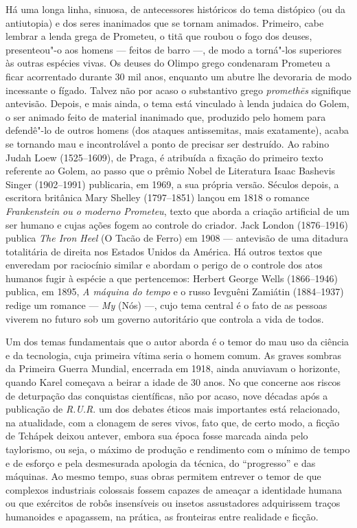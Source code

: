 Há uma longa linha, sinuosa, de antecessores históricos do tema distópico
(ou da antiutopia) e dos seres inanimados que se tornam animados. Primeiro,
cabe lembrar a lenda grega de Prometeu, o titã que roubou o fogo dos deuses,
presenteou"-o aos homens --- feitos de barro ---,  de modo a torná"-los superiores às
outras espécies vivas. Os deuses do Olimpo grego condenaram Prometeu a ficar
acorrentado durante 30 mil anos, enquanto um abutre lhe devoraria de modo
incessante o fígado. Talvez não por acaso o substantivo grego \textit{prometh\=es}
signifique antevisão. Depois, e mais ainda, o tema está
vinculado à lenda judaica do Golem, o ser animado feito de material inanimado
que, produzido pelo homem para defendê"-lo de outros homens (dos ataques
antissemitas, mais exatamente), acaba se tornando mau e incontrolável a ponto
de precisar ser destruído. Ao rabino Judah Loew (1525--1609), de Praga, é
atribuída a fixação do primeiro texto referente ao Golem, ao passo que o prêmio
Nobel de Literatura Isaac Bashevis Singer (1902--1991) publicaria, em 1969, a
sua própria versão. Séculos depois, a escritora britânica Mary Shelley
(1797--1851) lançou em 1818 o romance \textit{Frankenstein ou o moderno Prometeu}, texto
que aborda a criação artificial de um ser humano e cujas ações fogem ao
controle do criador. Jack London (1876--1916) publica \textit{The Iron Heel} (O Tacão de
Ferro) em 1908 --- antevisão de uma ditadura totalitária de direita nos Estados
Unidos da América. Há outros textos que enveredam por raciocínio similar e
abordam o perigo de o controle dos atos humanos fugir à espécie a que
pertencemos: Herbert George Wells (1866--1946) publica, em 1895, \textit{A máquina do tempo} 
e o russo Ievguêni Zamiátin (1884--1937) redige um
romance --- \textit{My} (Nós) ---, cujo tema central é o fato de as pessoas viverem no
futuro sob um governo autoritário que controla a vida de todos.

Um dos temas fundamentais que o autor aborda é o temor do mau uso da ciência
e da tecnologia, cuja primeira vítima  seria o homem comum. As graves sombras da
Primeira Guerra Mundial, encerrada em 1918, ainda anuviavam o horizonte, quando
Karel começava a beirar a idade de 30 anos. No que concerne aos riscos de
deturpação das conquistas científicas, não por acaso, nove décadas após a
publicação de \textit{R.U.R}.  um dos debates éticos mais importantes está relacionado,
na atualidade, com a clonagem de seres vivos, fato que, de certo modo, a ficção
de Tchápek deixou antever, embora sua época fosse marcada ainda pelo taylorismo,
ou seja, o máximo de produção e rendimento com o mínimo de tempo e de esforço e
pela desmesurada apologia da técnica, do “progresso” e das máquinas. Ao mesmo
tempo, suas obras permitem entrever o temor de que complexos industriais
colossais fossem capazes de ameaçar a identidade humana ou que exércitos de
robôs insensíveis ou insetos assustadores adquirissem traços humanoides e
apagassem, na prática, as fronteiras entre realidade e ficção.

